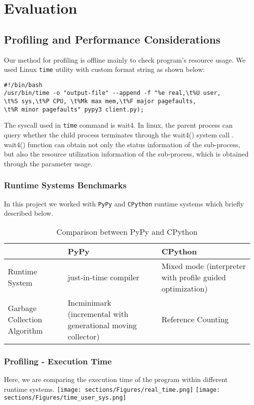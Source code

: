 \section{Evaluation}
\label{sec:Eval}
\subsection{Profiling and Performance Considerations}
Our method for profiling is offline mainly to check program's resource usage. We used Linux \texttt{time} utility with custom format string as shown below:
\begin{lstlisting}
#!/bin/bash
/usr/bin/time -o "output-file" --append -f "%e real,\t%U user,
\t%S sys,\t%P CPU, \t%Mk max mem,\t%F major pagefaults,
\t%R minor pagefaults" pypy3 client.py);
\end{lstlisting}

The syscall used in \texttt{time} command is wait4. In linux, the parent process can query whether the child process terminates through the wait4() system call \cite{wait4}. wait4() function can obtain not only the status information of the sub-process, but also the resource utilization information of the sub-process, which is obtained through the parameter usage. 

\subsubsection{Runtime Systems Benchmarks}
In this project we worked with \texttt{PyPy} and \texttt{CPython} runtime systems which briefly described below.
\begin{center}
\begin{table}[h]
 \caption{Comparison between PyPy and CPython}
\begin{tabular}{ | l | p{5cm} |p{5cm} |} 
 \hline
  & PyPy \cite{pypy}  & CPython \cite{cpython} \\ 
  \hline
  Runtime System & just-in-time compiler & Mixed mode (interpreter with profile guided optimization)  \\ 
  \hline
 Garbage Collection Algorithm & Incminimark (incremental with generational moving collector) & Reference Counting \\ 
 \hline
\end{tabular}
\end{table}
\end{center}

\subsubsection{Profiling - Execution Time}
Here, we are comparing the execution time of the program within different runtime systems. 
\hspace*{-0.8in}
\texttt{[image: sections/Figures/real\_time.png]}
\texttt{[image: sections/Figures/time\_user\_sys.png]}


